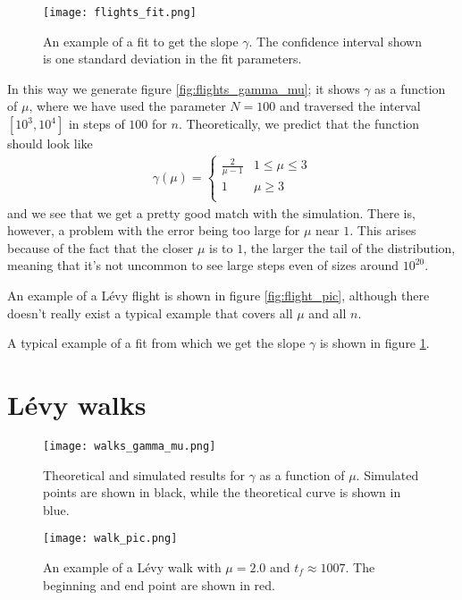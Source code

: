 \documentclass[10pt,a4paper,twocolumn]{article}
\begin{document}
\begin{figure}[h]
\centering
\captionsetup{justification=centering}
\texttt{[image: flights\_fit.png]}
\caption{An example of a fit to get the slope $\gamma$. The confidence interval shown is one standard deviation in the fit parameters.}
\label{fig:flights_fit}
\end{figure}

In this way we generate figure \ref{fig:flights_gamma_mu}; it shows $\gamma$ as a function of $\mu$, where we have used the parameter $N = 100$ and traversed the interval $[10^3,10^4]$ in steps of $100$ for $n$. Theoretically, we predict that the function should look like
%
\begin{align}
\gamma(\mu)= \begin{cases} 
      \frac{2}{\mu - 1} & 1 \leq \mu \leq 3 \\
      1 & \mu \geq 3 \\
   \end{cases}
\end{align}
%
and we see that we get a pretty good match with the simulation. There is, however, a problem with the error being too large for $\mu$ near $1$. This arises because of the fact that the closer $\mu$ is to $1$, the larger the tail of the distribution, meaning that it's not uncommon to see large steps even of sizes around $10^{20}$.

An example of a L\'evy flight is shown in figure \ref{fig:flight_pic}, although there doesn't really exist a typical example that covers all $\mu$ and all $n$.

A typical example of a fit from which we get the slope $\gamma$ is shown in figure \ref{fig:flights_fit}.


\section{L\'evy walks}

\begin{figure}[H]
\centering
\captionsetup{justification=centering}
\texttt{[image: walks\_gamma\_mu.png]}
\caption{Theoretical and simulated results for $\gamma$ as a function of $\mu$. Simulated points are shown in black, while the theoretical curve is shown in blue.}
\label{fig:walks_gamma_mu}
\end{figure}

\begin{figure}[H]
\centering
\captionsetup{justification=centering}
\texttt{[image: walk\_pic.png]}
\caption{An example of a L\'evy walk with $\mu = 2.0 $ and $t_f \approx 1007$. The beginning and end point are shown in red.}
\label{fig:walk_pic}
\end{figure}
\end{document}
